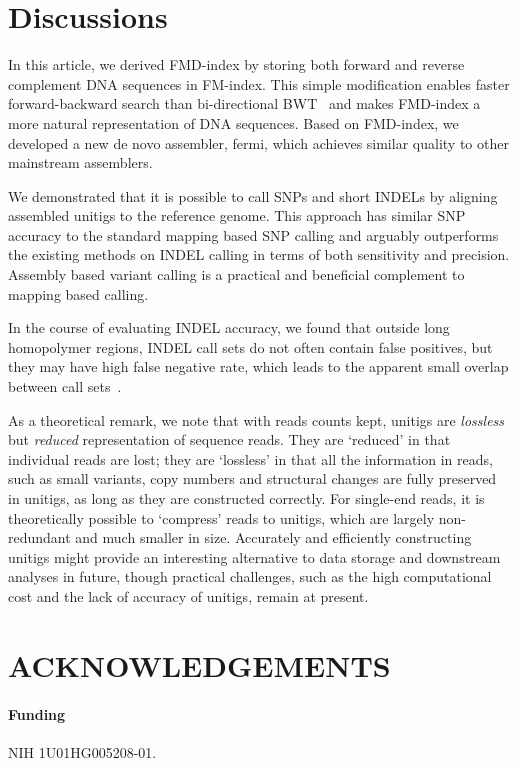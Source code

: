 \documentclass{bioinfo}
\begin{document}
\section{Discussions}
In this article, we derived FMD-index by storing both forward and reverse
complement DNA sequences in FM-index. This simple modification enables faster
forward-backward search than bi-directional BWT~\citep{Lam:2009fk} and makes
FMD-index a more natural representation of DNA sequences. Based on FMD-index,
we developed a new de novo assembler, fermi, which achieves similar quality
to other mainstream assemblers.

We demonstrated that it is possible to call SNPs and short INDELs by aligning
assembled unitigs to the reference genome. This approach has similar SNP
accuracy to the standard mapping based SNP calling and arguably outperforms
the existing methods on INDEL calling in terms of both sensitivity and
precision. Assembly based variant calling is a practical and beneficial
complement to mapping based calling.

In the course of evaluating INDEL accuracy, we found that outside long
homopolymer regions, INDEL call sets do not often contain false positives, but
they may have high false negative rate, which leads to the apparent small
overlap between call sets~\citep{Lam:2012fk}.

As a theoretical remark, we note that with reads counts kept, unitigs are
\emph{lossless} but \emph{reduced} representation of sequence reads. They are
`reduced' in that individual reads are lost; they are `lossless' in that all
the information in reads, such as small variants, copy numbers and structural
changes are fully preserved in unitigs, as long as they are constructed
correctly. For single-end reads, it is theoretically possible to `compress'
reads to unitigs, which are largely non-redundant and much smaller in size.
Accurately and efficiently constructing unitigs might provide an interesting
alternative to data storage and downstream analyses in future, though practical
challenges, such as the high computational cost and the lack of accuracy of
unitigs, remain at present.

\section*{ACKNOWLEDGEMENTS}

\paragraph{Funding\textcolon} NIH 1U01HG005208-01.

\end{document}
